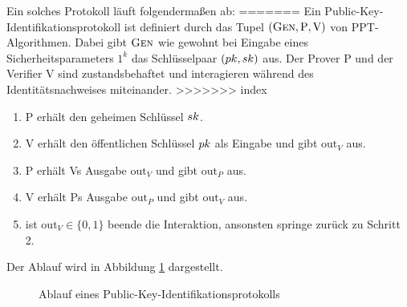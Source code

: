 Ein solches Protokoll läuft folgendermaßen ab:
=======
Ein Public-Key-Identifikationsprotokoll \indexPKIdentificationProtocol ist definiert durch das Tupel $(\textsc{Gen}, \mathrm{P}, \mathrm{V})$ von PPT-Algorithmen. Dabei gibt
$\textsc{Gen}$ wie gewohnt bei Eingabe eines Sicherheitsparameters $1^k$ das Schlüsselpaar $(pk, sk)$ aus. Der Prover P und der Verifier V
sind zustandsbehaftet und interagieren während des Identitätsnachweises miteinander.
>>>>>>> index
\begin{enumerate}
  \item P erhält den geheimen Schlüssel $sk$.
  \item V erhält den öffentlichen Schlüssel $pk$ als Eingabe und
gibt $\mathrm{out}_V$ aus.
  \item P erhält Vs Ausgabe $\mathrm{out}_V$ und gibt $\mathrm{out}_P$ aus.
  \item V erhält Ps Ausgabe $\mathrm{out}_P$ und gibt $\mathrm{out}_V$
    aus.
  \item ist $\mathrm{out}_V \in \{0,1\}$ beende die Interaktion,
    ansonsten springe zurück zu Schritt 2.
\end{enumerate} 

Der Ablauf wird in Abbildung \ref{fig:pki-identifikation} dargestellt.  

\begin{figure}[h]
\begin{center}
  \caption{Ablauf eines Public-Key-Identifikationsprotokolls}
  \label{fig:pki-identifikation}
\end{center}
\end{figure}


